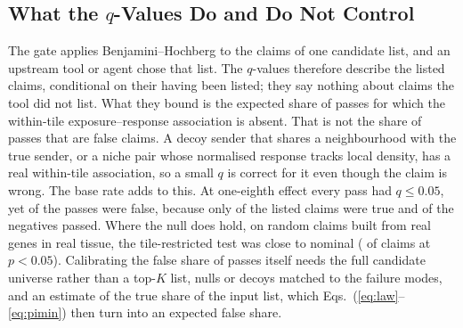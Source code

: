 \documentclass[letterpaper]{article} %
\begin{document}
\subsection{What the $q$-Values Do and Do Not Control}
The gate applies Benjamini--Hochberg to the claims of one candidate list, and an upstream tool or agent chose that
list. The $q$-values therefore describe the listed claims, conditional on their having been listed; they say nothing
about claims the tool did not list. What they bound is the expected share of passes for which the within-tile
exposure--response association is absent. That is not the share of passes that are false claims. A decoy sender that
shares a neighbourhood with the true sender, or a niche pair whose normalised response tracks local density, has a real
within-tile association, so a small $q$ is correct for it even though the claim is wrong. The base rate adds to this.
At one-eighth effect every pass had $q\leq0.05$, yet \hfiveDefaultEighthPRafter{} of the passes were false, because
only \baseEighthPrevalenceTrue{} of the listed claims were true and \baseEighthNegPassRate{} of the negatives passed.
Where the null does hold, on random claims built from real genes in real tissue, the tile-restricted test was close to
nominal (\rnullFrozenFive{} of claims at $p<0.05$). Calibrating the false share of passes itself needs the full
candidate universe rather than a top-$K$ list, nulls or decoys matched to the failure modes, and an estimate of the
true share of the input list, which Eqs.~(\ref{eq:law}--\ref{eq:pimin}) then turn into an expected false share.
\end{document}
